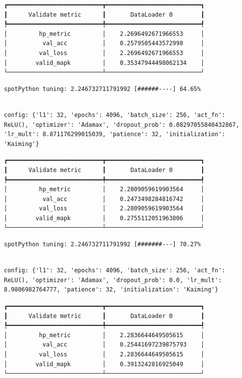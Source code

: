 \documentclass[
  letterpaper,
  DIV=11,
  numbers=noendperiod]{scrreprt}
\begin{document}
\begin{verbatim}
┏━━━━━━━━━━━━━━━━━━━━━━━━━━━┳━━━━━━━━━━━━━━━━━━━━━━━━━━━┓
┃      Validate metric      ┃       DataLoader 0        ┃
┡━━━━━━━━━━━━━━━━━━━━━━━━━━━╇━━━━━━━━━━━━━━━━━━━━━━━━━━━┩
│         hp_metric         │    2.2696492671966553     │
│          val_acc          │    0.2579505443572998     │
│         val_loss          │    2.2696492671966553     │
│        valid_mapk         │    0.35347944498062134    │
└───────────────────────────┴───────────────────────────┘
\end{verbatim}

\begin{verbatim}
spotPython tuning: 2.246732711791992 [######----] 64.65% 
\end{verbatim}

\begin{verbatim}

config: {'l1': 32, 'epochs': 4096, 'batch_size': 256, 'act_fn': ReLU(), 'optimizer': 'Adamax', 'dropout_prob': 0.08297055840432867, 'lr_mult': 8.871176299015039, 'patience': 32, 'initialization': 'Kaiming'}
\end{verbatim}

\begin{verbatim}
┏━━━━━━━━━━━━━━━━━━━━━━━━━━━┳━━━━━━━━━━━━━━━━━━━━━━━━━━━┓
┃      Validate metric      ┃       DataLoader 0        ┃
┡━━━━━━━━━━━━━━━━━━━━━━━━━━━╇━━━━━━━━━━━━━━━━━━━━━━━━━━━┩
│         hp_metric         │    2.2809059619903564     │
│          val_acc          │    0.2473498284816742     │
│         val_loss          │    2.2809059619903564     │
│        valid_mapk         │    0.2755112051963806     │
└───────────────────────────┴───────────────────────────┘
\end{verbatim}

\begin{verbatim}
spotPython tuning: 2.246732711791992 [#######---] 70.27% 
\end{verbatim}

\begin{verbatim}

config: {'l1': 32, 'epochs': 4096, 'batch_size': 256, 'act_fn': ReLU(), 'optimizer': 'Adamax', 'dropout_prob': 0.0, 'lr_mult': 8.9806982764777, 'patience': 32, 'initialization': 'Kaiming'}
\end{verbatim}

\begin{verbatim}
┏━━━━━━━━━━━━━━━━━━━━━━━━━━━┳━━━━━━━━━━━━━━━━━━━━━━━━━━━┓
┃      Validate metric      ┃       DataLoader 0        ┃
┡━━━━━━━━━━━━━━━━━━━━━━━━━━━╇━━━━━━━━━━━━━━━━━━━━━━━━━━━┩
│         hp_metric         │    2.2836644649505615     │
│          val_acc          │    0.25441697239875793    │
│         val_loss          │    2.2836644649505615     │
│        valid_mapk         │    0.3913242816925049     │
└───────────────────────────┴───────────────────────────┘
\end{verbatim}
\end{document}
